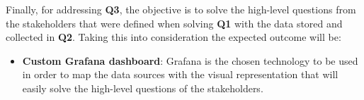 \documentclass[12pt]{article}
\begin{document}
Finally, for addressing \textbf{Q3}, the objective is to solve the high-level questions from the stakeholders that were defined when solving \textbf{Q1} with the data stored and collected in \textbf{Q2}. Taking this into consideration the expected outcome will be:

\begin{itemize}
    \item \textbf{Custom Grafana dashboard}: Grafana is the chosen technology to be used in order to map the data sources with the visual representation that will easily solve the high-level questions of the stakeholders.
\end{itemize}



\end{document}
